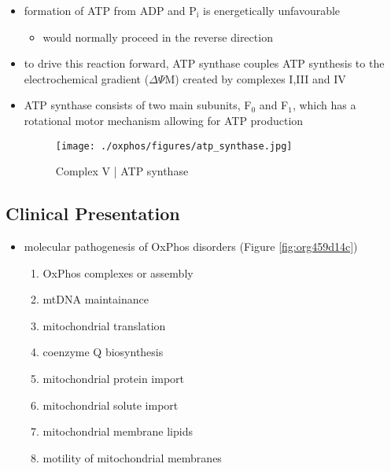 \documentclass{scrartcl}
\begin{document}
\begin{enumerate}
{\small{}}

\begin{itemize}
\item formation of ATP from ADP and P\(_{\text{i}}\) is energetically unfavourable
\begin{itemize}
\item would normally proceed in the reverse direction
\end{itemize}

\item to drive this reaction forward, ATP synthase couples ATP synthesis
to the electrochemical gradient (\(\Delta \Psi\)M) created by complexes
I,III and IV

\item ATP synthase consists of two main subunits, F\(_{\text{0}}\) and F\(_{\text{1}}\), which has a
rotational motor mechanism allowing for ATP production

\begin{figure}[htbp]
\centering
\texttt{[image: ./oxphos/figures/atp\_synthase.jpg]}
\caption{\label{fig:org36e14e6}
Complex V | ATP synthase}
\end{figure}
\end{itemize}
\end{enumerate}

\subsection{Clinical Presentation}
\label{sec:org7932a54}
\begin{itemize}
\item molecular pathogenesis of OxPhos disorders (Figure \ref{fig:org459d14c})
\begin{enumerate}
\item OxPhos complexes or assembly
\item mtDNA maintainance
\item mitochondrial translation
\item coenzyme Q biosynthesis
\item mitochondrial protein import
\item mitochondrial solute import
\item mitochondrial membrane lipids
\item motility of mitochondrial membranes
\end{enumerate}
\end{itemize}
\end{document}
